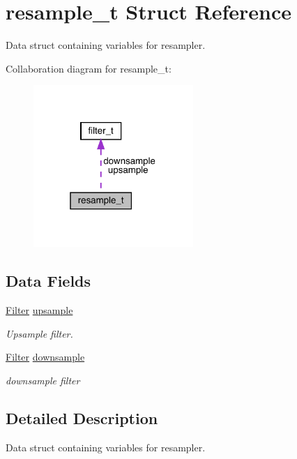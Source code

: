 \hypertarget{structresample__t}{}\section{resample\+\_\+t Struct Reference}
\label{structresample__t}


Data struct containing variables for resampler.  




Collaboration diagram for resample\+\_\+t\+:\nopagebreak
\begin{figure}[H]
\begin{center}
\leavevmode
\includegraphics[width=172pt]{structresample__t__coll__graph}
\end{center}
\end{figure}
\subsection*{Data Fields}
\begin{DoxyCompactItemize}
\item 
\mbox{\hyperlink{filter_8h_a69e34b8aa259d2ca0b81b5c95f395bdf}{Filter}} \mbox{\hyperlink{structresample__t_a7f06c113fbaa88f3f943e84358d05e45}{upsample}}
\begin{DoxyCompactList}\small\item\em Upsample filter. \end{DoxyCompactList}\item 
\mbox{\hyperlink{filter_8h_a69e34b8aa259d2ca0b81b5c95f395bdf}{Filter}} \mbox{\hyperlink{structresample__t_a24f8e6d91db22e6809c3be712a0a6437}{downsample}}
\begin{DoxyCompactList}\small\item\em downsample filter \end{DoxyCompactList}\end{DoxyCompactItemize}


\subsection{Detailed Description}
Data struct containing variables for resampler. 


